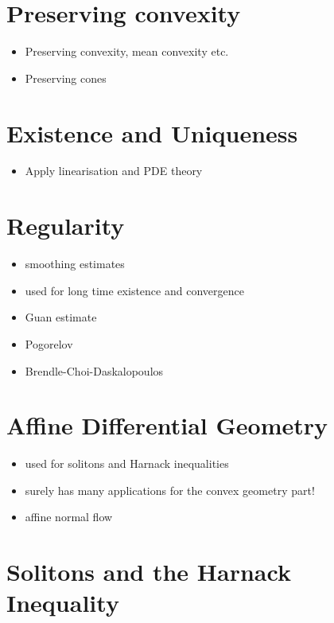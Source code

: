 \section{Preserving convexity}

\begin{itemize}
\item Preserving convexity, mean convexity etc.
\item Preserving cones
\end{itemize}

\section{Existence and Uniqueness}

\begin{itemize}
\item Apply linearisation and PDE theory
\end{itemize}

\section{Regularity}

\begin{itemize}
\item smoothing estimates
\item used for long time existence and convergence
\item Guan estimate
\item Pogorelov
\item Brendle-Choi-Daskalopoulos
\end{itemize}

\section{Affine Differential Geometry}

\begin{itemize}
\item used for solitons and Harnack inequalities
\item surely has many applications for the convex geometry part!
\item affine normal flow
\end{itemize}

\section{Solitons and the Harnack Inequality}

